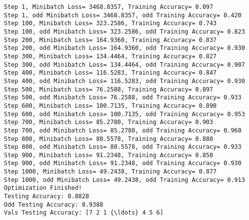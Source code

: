 \documentclass[11pt]{article}
\begin{document}
    \begin{Verbatim}[commandchars=\\\{\}]
Step 1, Minibatch Loss= 3468.8357, Training Accuracy= 0.097
Step 1, odd Minibatch Loss= 3468.8357, odd Training Accuracy= 0.420
Step 100, Minibatch Loss= 323.2586, Training Accuracy= 0.743
Step 100, odd Minibatch Loss= 323.2586, odd Training Accuracy= 0.823
Step 200, Minibatch Loss= 164.9360, Training Accuracy= 0.837
Step 200, odd Minibatch Loss= 164.9360, odd Training Accuracy= 0.930
Step 300, Minibatch Loss= 134.4464, Training Accuracy= 0.827
Step 300, odd Minibatch Loss= 134.4464, odd Training Accuracy= 0.907
Step 400, Minibatch Loss= 116.5283, Training Accuracy= 0.847
Step 400, odd Minibatch Loss= 116.5283, odd Training Accuracy= 0.930
Step 500, Minibatch Loss= 76.2588, Training Accuracy= 0.897
Step 500, odd Minibatch Loss= 76.2588, odd Training Accuracy= 0.933
Step 600, Minibatch Loss= 100.7135, Training Accuracy= 0.890
Step 600, odd Minibatch Loss= 100.7135, odd Training Accuracy= 0.953
Step 700, Minibatch Loss= 85.2780, Training Accuracy= 0.903
Step 700, odd Minibatch Loss= 85.2780, odd Training Accuracy= 0.960
Step 800, Minibatch Loss= 80.5578, Training Accuracy= 0.880
Step 800, odd Minibatch Loss= 80.5578, odd Training Accuracy= 0.933
Step 900, Minibatch Loss= 91.2348, Training Accuracy= 0.850
Step 900, odd Minibatch Loss= 91.2348, odd Training Accuracy= 0.930
Step 1000, Minibatch Loss= 49.2438, Training Accuracy= 0.877
Step 1000, odd Minibatch Loss= 49.2438, odd Training Accuracy= 0.913
Optimization Finished!
Testing Accuracy: 0.8828
Odd Testing Accuracy: 0.9388
Vals Testing Accuracy: [7 2 1 {\ldots} 4 5 6]

    \end{Verbatim}
\end{document}
